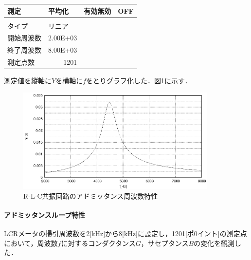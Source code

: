 \documentclass[dvipdfmx,titlepage,a4j]{jsarticle}  %
\numberwithin{equation}{section}
\begin{document}
\begin{table}[H]
\begin{center}
\begin{tabular}{l|l|l|l}
      測定           & 平均化                        & 有効無効       & OFF                          \\ \hline
      [スイープ測定] &                               &                &                              \\ \hline
      タイプ         & リニア                        &                &                              \\ \hline
      開始周波数     & \multicolumn{1}{r|}{2.00E+03} &                &                              \\ \hline
      終了周波数     & \multicolumn{1}{r|}{8.00E+03} &                &                              \\ \hline
      測定点数       & \multicolumn{1}{r|}{1201}     &                &                              \\ \hline
    \end{tabular}
  \end{center}
  \label{tbl:lcrm-admitance}
\end{table}

測定値を縦軸に$Y$を横軸に$f$をとりグラフ化した．図\ref{fig:A_YTheta.eps}に示す．
\begin{figure}[H]
  \centering
  \includegraphics[width=10cm]{../gnuplot/A_YTheta.eps}
  \caption{R-L-C共振回路のアドミッタンス周波数特性}
  \label{fig:A_YTheta.eps}
\end{figure}

\paragraph{アドミッタンスループ特性}
LCRメータの掃引周波数を2[kHz]から8[kHz]に設定し，1201[ポ0イント]の測定点において，周波数$f$に対するコンダクタンス$G$，サセプタンス$B$の変化を観測した．
\end{document}
